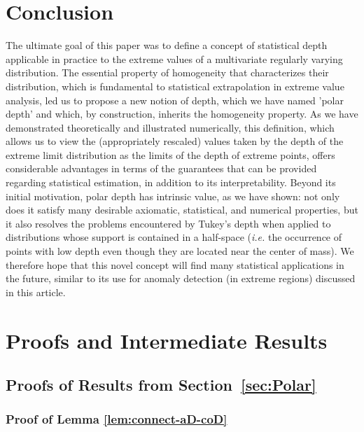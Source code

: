 \documentclass{article}
\numberwithin{equation}{section}
\begin{document}
\section{Conclusion}\label{sec:conclusion}
%

The ultimate goal of this paper was to define a concept of statistical depth applicable in practice to the extreme values of a multivariate regularly varying distribution. The essential property of homogeneity that characterizes their distribution, which is fundamental to statistical extrapolation in extreme value analysis, led us to propose a new notion of depth, which we have named 'polar depth' and which, by construction, inherits the homogeneity property. As we have demonstrated theoretically and illustrated numerically, this definition, which allows us to view the (appropriately rescaled) values taken by the depth of the extreme limit distribution as the limits of the depth of extreme points, offers considerable advantages in terms of the guarantees that can be provided regarding statistical estimation, in addition to its interpretability. Beyond its initial motivation, polar depth has intrinsic value, as we have shown: not only does it satisfy many desirable axiomatic, statistical, and numerical properties, but it also resolves the problems encountered by Tukey’s depth when applied to distributions whose support is contained in a half-space (\textit{i.e.} the occurrence of points with low depth even though they are located near the center of mass). We therefore hope that this novel concept will find many statistical applications in the future, similar to its use for anomaly detection (in extreme regions) discussed in this article.




\newpage
\appendix

\section{Proofs and Intermediate Results}\label{sec:proofs}
\subsection{Proofs of Results from Section~\ref{sec:Polar}}
\subsubsection{Proof of Lemma \ref{lem:connect-aD-coD}}
%
\end{document}
